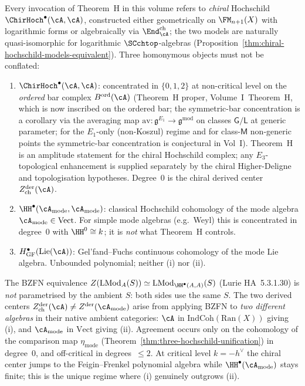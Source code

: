 \begin{remark}%
\label{rem:thm-H-three-way-scope}%
%
%
Every invocation of Theorem~H in this volume refers to \emph{chiral} Hochschild
$\ChirHoch^\bullet(\cA,\cA)$, constructed either geometrically on $\FM_{n+1}(X)$ with
logarithmic forms or algebraically via $\End^{\mathrm{ch}}_\cA$; the two models are
naturally quasi-isomorphic for logarithmic $\SCchtop$-algebras
(Proposition~\ref{thm:chiral-hochschild-models-equivalent}). Three homonymous
objects must not be conflated:
\begin{enumerate}
 \item[\textup{(i)}] $\ChirHoch^\bullet(\cA,\cA)$: concentrated in $\{0,1,2\}$
 at non-critical level on the \emph{ordered} bar complex $B^{\mathrm{ord}}(\cA)$
 (Theorem~H proper, Volume~I~Theorem~H, which is now inscribed on the ordered
 bar; the symmetric-bar concentration is a corollary via the averaging map
 $\mathrm{av}\colon \mathfrak{g}^{E_1}\to\mathfrak{g}^{\mathrm{mod}}$ on classes
 $\mathsf{G}/\mathsf{L}$ at generic parameter; for the $E_1$-only (non-Koszul)
 regime and for class-$\mathsf{M}$ non-generic points the symmetric-bar
 concentration is conjectural in Vol~I). Theorem~H is an amplitude
 statement for the chiral Hochschild complex; any $E_3$-topological
 enhancement is supplied separately by the chiral Higher-Deligne and
 topologisation hypotheses. Degree~$0$ is the chiral derived center
 $Z^{\mathrm{der}}_{\mathrm{ch}}(\cA)$.
 \item[\textup{(ii)}] $\HH^\bullet(\cA_{\mathrm{mode}},\cA_{\mathrm{mode}})$:
 classical Hochschild cohomology of the mode algebra $\cA_{\mathrm{mode}}\in\mathrm{Vect}$.
 For simple mode algebras (e.g.\ Weyl) this is concentrated in degree~$0$ with
 $\HH^0\cong k$; it is \emph{not} what Theorem~H controls.
 \item[\textup{(iii)}] $H^\bullet_{\mathrm{GF}}(\mathrm{Lie}(\cA))$:
 Gel'fand--Fuchs continuous cohomology of the mode Lie algebra. Unbounded
 polynomial; neither (i) nor (ii).
\end{enumerate}
The BZFN equivalence $Z(\mathrm{LMod}_A(S))\simeq\mathrm{LMod}_{\HH^\bullet(A,A)}(S)$
\textup{(}Lurie HA~5.3.1.30\textup{)} is \emph{not} parametrised by the ambient
$S$: both sides use the same $S$. The two derived
centers $Z^{\mathrm{der}}_{\mathrm{ch}}(\cA)\ne Z^{\mathrm{der}}(\cA_{\mathrm{mode}})$
arise from applying BZFN to \emph{two different algebras} in their native ambient
categories: $\cA$ in $\mathrm{IndCoh}(\mathrm{Ran}(X))$ giving (i), and
$\cA_{\mathrm{mode}}$ in $\mathrm{Vect}$ giving (ii). Agreement occurs only on
the cohomology of the comparison map $\eta_{\mathrm{mode}}$
\textup{(}Theorem~\ref{thm:three-hochschild-unification}\textup{)} in degree~$0$,
and off-critical in degrees~$\le 2$. At critical level $k=-h^\vee$ the chiral center
jumps to the Feigin--Frenkel polynomial algebra while $\HH^\bullet(\cA_{\mathrm{mode}})$
stays finite; this is the unique regime where (i) genuinely outgrows (ii).
\end{remark}

